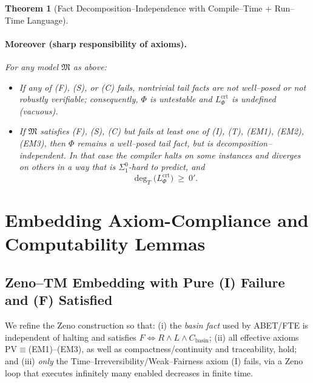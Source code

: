 \documentclass[12pt]{article}
\theoremstyle{definition}
\theoremstyle{plain}
\newtheorem{theorem}{Theorem}[section]
\begin{document}
\begin{theorem}[Fact Decomposition–Independence with Compile–Time + Run–Time Language]
\paragraph{Moreover (sharp responsibility of axioms).}
For any model \(\mathfrak M\) as above:
\begin{itemize}[itemsep=2pt,leftmargin=2em]
  \item If \emph{any} of \textup{(F)}, \textup{(S)}, or \textup{(C)} fails, nontrivial tail facts are not well–posed or not robustly verifiable; consequently, \(\Phi\) is \emph{untestable} and \(L^{\mathrm{crt}}_{\Phi}\) is undefined (vacuous).
  \item If \(\mathfrak M\) satisfies \textup{(F)}, \textup{(S)}, \textup{(C)} but fails \emph{at least one} of \textup{(I)}, \textup{(T)}, \textup{(EM1)}, \textup{(EM2)}, \textup{(EM3)}, then \(\Phi\) remains a well–posed tail fact, but is \emph{decomposition–independent}.  
        In that case the compiler halts on some instances and diverges on others in a way that is \(\Sigma^0_1\)-hard to predict, and
        \[
          \deg_T\!\bigl(L^{\mathrm{crt}}_{\Phi}\bigr) \ \ge\ 0'.
        \]
\end{itemize}
\end{theorem}




\section{Embedding Axiom-Compliance and Computability Lemmas}
\subsection{Zeno–TM Embedding with Pure (I) Failure and (F) Satisfied}
\label{sec:zeno-i-failure-fixed}

We refine the Zeno construction so that:
(i) the \emph{basin fact} used by ABET/FTE is independent of halting and satisfies
\(F\iff R\wedge L\wedge C_{\text{basin}}\);
(ii) all effective axioms PV\(\equiv\)(EM1)–(EM3), as well as compactness/continuity and traceability, hold; and
(iii) \emph{only} the Time–Irreversibility/Weak–Fairness axiom (I) fails, via a Zeno loop that executes infinitely many enabled decreases in finite time.
\end{document}
